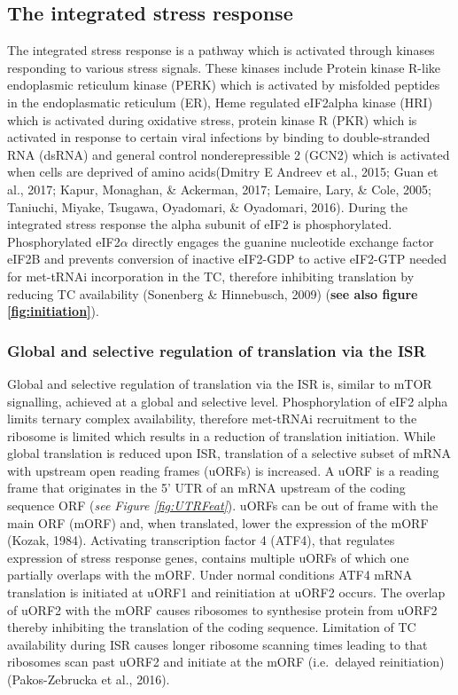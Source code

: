 \documentclass[12pt,openany]{book}
\begin{document}
\subsection{The integrated stress response}

The integrated stress response is a pathway which is activated through
kinases responding to various stress signals. These kinases include
Protein kinase R-like endoplasmic reticulum kinase (PERK) which is
activated by misfolded peptides in the endoplasmatic reticulum (ER),
Heme regulated eIF2alpha kinase (HRI) which is activated during
oxidative stress, protein kinase R (PKR) which is activated in response
to certain viral infections by binding to double-stranded RNA (dsRNA)
and general control nonderepressible 2 (GCN2) which is activated when
cells are deprived of amino acids(Dmitry E Andreev et al., 2015; Guan et
al., 2017; Kapur, Monaghan, \& Ackerman, 2017; Lemaire, Lary, \& Cole,
2005; Taniuchi, Miyake, Tsugawa, Oyadomari, \& Oyadomari, 2016). During
the integrated stress response the alpha subunit of eIF2 is
phosphorylated. Phosphorylated eIF2\(\alpha\) directly engages the
guanine nucleotide exchange factor eIF2B and prevents conversion of
inactive eIF2-GDP to active eIF2-GTP needed for met-tRNAi incorporation
in the TC, therefore inhibiting translation by reducing TC availability
(Sonenberg \& Hinnebusch, 2009) (\textbf{see also figure
\ref{fig:initiation}}).

\subsubsection{Global and selective regulation of translation via the ISR}

Global and selective regulation of translation via the ISR is, similar
to mTOR signalling, achieved at a global and selective level.
Phosphorylation of eIF2 alpha limits ternary complex availability,
therefore met-tRNAi recruitment to the ribosome is limited which results
in a reduction of translation initiation. While global translation is
reduced upon ISR, translation of a selective subset of mRNA with
upstream open reading frames (uORFs) is increased. A uORF is a reading
frame that originates in the 5' UTR of an mRNA upstream of the coding
sequence ORF (\emph{see Figure \ref{fig:UTRFeat}}). uORFs can be out of
frame with the main ORF (mORF) and, when translated, lower the
expression of the mORF (Kozak, 1984). Activating transcription factor 4
(ATF4), that regulates expression of stress response genes, contains
multiple uORFs of which one partially overlaps with the mORF. Under
normal conditions ATF4 mRNA translation is initiated at uORF1 and
reinitiation at uORF2 occurs. The overlap of uORF2 with the mORF causes
ribosomes to synthesise protein from uORF2 thereby inhibiting the
translation of the coding sequence. Limitation of TC availability during
ISR causes longer ribosome scanning times leading to that ribosomes scan
past uORF2 and initiate at the mORF (i.e.~delayed reinitiation)
(Pakos-Zebrucka et al., 2016).
\end{document}
